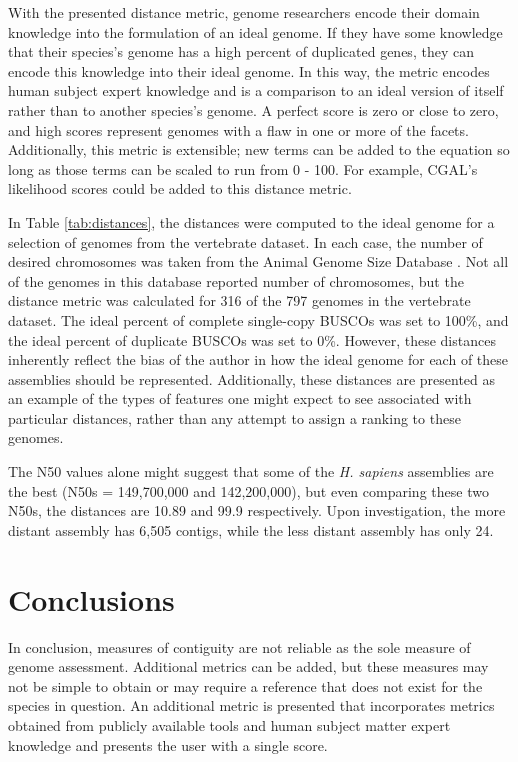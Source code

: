 \documentclass[twocolumn, dvipsnames]{bmcart}%
\begin{document}
With the presented distance metric, genome researchers encode their domain knowledge into the formulation of an ideal genome. If they have some knowledge that their species's genome has a high percent of duplicated genes, they can encode this knowledge into their ideal genome. In this way, the metric encodes human subject expert knowledge and is a comparison to an ideal version of itself rather than to another species's genome. A perfect score is zero or close to zero, and high scores represent genomes with a flaw in one or more of the facets. Additionally, this metric is extensible; new terms can be added to the equation so long as those terms can be scaled to run from 0 - 100. For example, CGAL's likelihood scores could be added to this distance metric.

In Table \ref{tab:distances}, the distances were computed to the ideal genome for a selection of genomes from the vertebrate dataset. In each case, the number of desired chromosomes was taken from the Animal Genome Size Database \cite{gregory_animal_2005}. Not all of the genomes in this database reported number of chromosomes, but the distance metric was calculated for 316 of the 797 genomes in the vertebrate dataset. The ideal percent of complete single-copy BUSCOs was set to 100\%, and the ideal percent of duplicate BUSCOs was set to 0\%. However, these distances inherently reflect the bias of the author in how the ideal genome for each of these assemblies should be represented. Additionally, these distances are presented as an example of the types of features one might expect to see associated with particular distances, rather than any attempt to assign a ranking to these genomes.

The N50 values alone might suggest that some of the \textit{H. sapiens} assemblies are the best (N50s = 149,700,000 and 142,200,000), but even comparing these two N50s, the distances are 10.89 and 99.9 respectively. Upon investigation, the more distant assembly has 6,505 contigs, while the less distant assembly has only 24.

\section*{Conclusions}

In conclusion, measures of contiguity are not reliable as the sole measure of genome assessment. Additional metrics can be added, but these measures may not be simple to obtain or may require a reference that does not exist for the species in question. An additional metric is presented that incorporates metrics obtained from publicly available tools and human subject matter expert knowledge and presents the user with a single score.
\end{document}
